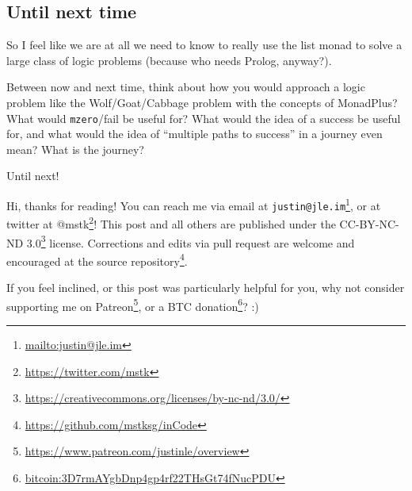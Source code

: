 \documentclass[]{article}
\renewcommand{\href}[2]{#2\footnote{\url{#1}}}
\begin{document}
\hypertarget{until-next-time}{%
\subsection{Until next time}\label{until-next-time}}

So I feel like we are at all we need to know to really use the list monad to
solve a large class of logic problems (because who needs Prolog, anyway?).

Between now and next time, think about how you would approach a logic problem
like the Wolf/Goat/Cabbage problem with the concepts of MonadPlus? What would
\texttt{mzero}/fail be useful for? What would the idea of a success be useful
for, and what would the idea of ``multiple paths to success'' in a journey even
mean? What is the journey?

Until next!

Hi, thanks for reading! You can reach me via email at
\href{mailto:justin@jle.im}{\nolinkurl{justin@jle.im}}, or at twitter at
\href{https://twitter.com/mstk}{@mstk}! This post and all others are published
under the \href{https://creativecommons.org/licenses/by-nc-nd/3.0/}{CC-BY-NC-ND
3.0} license. Corrections and edits via pull request are welcome and encouraged
at \href{https://github.com/mstksg/inCode}{the source repository}.

If you feel inclined, or this post was particularly helpful for you, why not
consider \href{https://www.patreon.com/justinle/overview}{supporting me on
Patreon}, or a \href{bitcoin:3D7rmAYgbDnp4gp4rf22THsGt74fNucPDU}{BTC donation}?
:)
\end{document}
